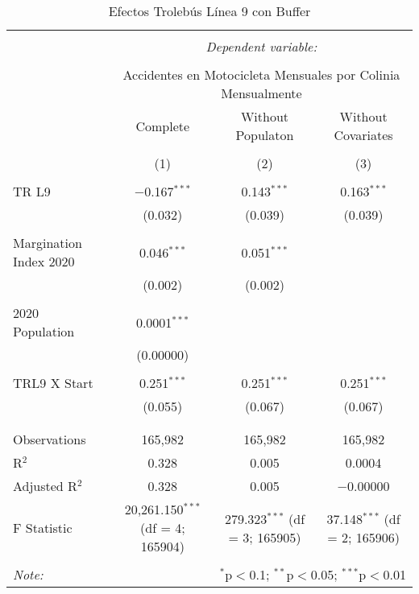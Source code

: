 
\begin{table}[!htbp] \centering 
  \caption{Efectos Trolebús Línea 9 con Buffer} 
  \label{} 
\begin{tabular}{@{\extracolsep{5pt}}lccc} 
\\[-1.8ex]\hline 
\hline \\[-1.8ex] 
 & \multicolumn{3}{c}{\textit{Dependent variable:}} \\ 
\cline{2-4} 
\\[-1.8ex] & \multicolumn{3}{c}{Accidentes en Motocicleta Mensuales por Colinia Mensualmente} \\ 
 & Complete & Without Populaton & Without Covariates \\ 
\\[-1.8ex] & (1) & (2) & (3)\\ 
\hline \\[-1.8ex] 
 TR L9 & $-$0.167$^{***}$ & 0.143$^{***}$ & 0.163$^{***}$ \\ 
  & (0.032) & (0.039) & (0.039) \\ 
  & & & \\ 
 Margination Index 2020 & 0.046$^{***}$ & 0.051$^{***}$ &  \\ 
  & (0.002) & (0.002) &  \\ 
  & & & \\ 
 2020 Population & 0.0001$^{***}$ &  &  \\ 
  & (0.00000) &  &  \\ 
  & & & \\ 
 TRL9 X Start & 0.251$^{***}$ & 0.251$^{***}$ & 0.251$^{***}$ \\ 
  & (0.055) & (0.067) & (0.067) \\ 
  & & & \\ 
\hline \\[-1.8ex] 
Observations & 165,982 & 165,982 & 165,982 \\ 
R$^{2}$ & 0.328 & 0.005 & 0.0004 \\ 
Adjusted R$^{2}$ & 0.328 & 0.005 & $-$0.00000 \\ 
F Statistic & 20,261.150$^{***}$ (df = 4; 165904) & 279.323$^{***}$ (df = 3; 165905) & 37.148$^{***}$ (df = 2; 165906) \\ 
\hline 
\hline \\[-1.8ex] 
\textit{Note:}  & \multicolumn{3}{r}{$^{*}$p$<$0.1; $^{**}$p$<$0.05; $^{***}$p$<$0.01} \\ 
\end{tabular} 
\end{table} 
